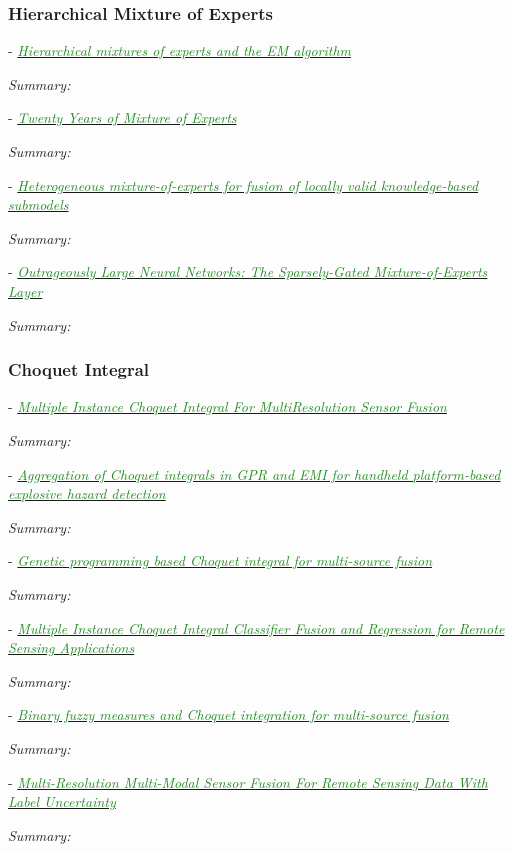 \documentclass[]{article}
\newcommand{\paperentry}[4]{
            \hangindent=1cm
            \cite{#1} - \href{run:../References/#3}{\textcolor{ForestGreen}{\textit{#2}}}
            
            \noindent            
            \begin{minipage}[t]{0.1\linewidth}\hfill\end{minipage}
            \begin{minipage}[t]{0.8\linewidth}\textcolor{NavyBlue}{{\textit{Summary:}}}#4\end{minipage}
            \vspace{.25cm}
          }
\begin{document}
	
		\subsubsection{Hierarchical Mixture of Experts}
		
			\paperentry{Jordan1993HME}
			{Hierarchical mixtures of experts and the EM algorithm}
			{Fusion/HME/Jordan1993HME.pdf}
			{}
		
			\paperentry{Yuksel2012TwentyYearsMixtureofExperts}
			{Twenty Years of Mixture of Experts}
			{Fusion/HME/Yuksel2012TwentyYearsMixtureofExperts.pdf}
			{}
			
			\paperentry{Beyer2009HeterogeneousMixtureOfExperts}
			{Heterogeneous mixture-of-experts for fusion of locally valid knowledge-based submodels}
			{Fusion/HME/Beyer2009HeterogeneousMixtureOfExperts.pdf}
			{}
			
			\paperentry{Shazeer2017SparselyGatedMixtureOfExperts}
			{Outrageously Large Neural Networks: The Sparsely-Gated Mixture-of-Experts Layer}
			{Fusion/HME/Shazeer2017SparselyGatedMixtureOfExperts.pdf}
			{}
		
		
		\subsubsection{Choquet Integral}
		
			\paperentry{Du2017Thesis}
			{Multiple Instance Choquet Integral For MultiResolution Sensor Fusion}
			{Fusion/Du2017Thesis}
			{}
		
			\paperentry{Smith2017ChoquetIntegralLandmine}
			{Aggregation of Choquet integrals in GPR and EMI for handheld platform-based explosive hazard detection}
			{Fusion/Choquet/Smith2017ChoquetIntegralLandmine.pdf}
			{}
			
			\paperentry{Smith2017GeneticProgrammingChoquetIntegral}
			{Genetic programming based Choquet integral for multi-source fusion}
			{Fusion/Choquet/Smith2017GeneticProgrammingChoquetIntegral.pdf}
			{}
		
			\paperentry{Du2019MIChoquetIntegral}
			{Multiple Instance Choquet Integral Classifier Fusion and Regression for Remote Sensing Applications}
			{Fusion/Choquet/Du2019MIChoquetIntegral.pdf}
			{}
		
			\paperentry{Anderson2017BinaryFuzzyMeasureChoquetIntegral}
			{Binary fuzzy measures and Choquet integration for multi-source fusion}
			{Fusion/Choquet/Anderson2017BinaryFuzzyMeasureChoquetIntegral.pdf}
			{}
			
			\paperentry{Du2018MultiResolutionSensorFusion}
			{Multi-Resolution Multi-Modal Sensor Fusion For Remote Sensing Data With Label Uncertainty}
			{Fusion/Choquet/Du2018MultiResolutionSensorFusion.pdf}
			{}
			
\end{document}
